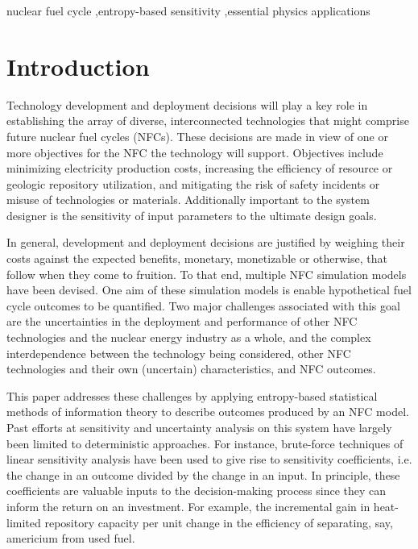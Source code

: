 \documentclass[preprint,12pt]{elsarticle}
\begin{document}
\begin{frontmatter}
\begin{keyword}
nuclear fuel cycle \sep entropy-based sensitivity \sep essential physics applications
\end{keyword}

\end{frontmatter}



\section{Introduction}
\label{sec:intro}

Technology development and deployment decisions will play a key role in
establishing the array of diverse, interconnected technologies that might comprise
future nuclear fuel cycles (NFCs).  These decisions are made in view of one or more
objectives for the NFC the technology will support.  Objectives include minimizing
electricity production costs, increasing the efficiency of resource or geologic
repository utilization, and mitigating the risk of safety incidents or misuse of
technologies or materials.  Additionally important to the system designer is the sensitivity 
of input parameters to the ultimate design goals.  

In general, development and deployment decisions are justified by weighing their costs 
against the expected benefits, monetary, monetizable or otherwise, that follow when they 
come to fruition.  To that end, multiple NFC simulation models  \cite{Jacobson2009, GENIUS1} 
have been devised.  One aim of these simulation models is enable 
hypothetical fuel cycle outcomes to be quantified.  
Two major challenges associated with this goal are the uncertainties in the deployment and performance 
of other NFC technologies and the nuclear energy industry as a whole, and the complex 
interdependence between the technology being considered, other NFC technologies and their 
own (uncertain) characteristics, and NFC outcomes.

This paper addresses these challenges by applying entropy-based statistical methods of information
theory to describe outcomes produced by an NFC model.  Past efforts at sensitivity and uncertainty
analysis on this system have largely been limited to deterministic approaches.  For instance,
brute-force techniques of linear sensitivity analysis have been used to give rise to sensitivity
coefficients, i.e. the change in an outcome divided by the change in an input.  In principle, these
coefficients are valuable inputs to the decision-making process since they can inform the
return on an investment.  For example, the incremental gain in heat-limited repository capacity per
unit change in the efficiency of separating, say, americium from used fuel.
\end{document}
